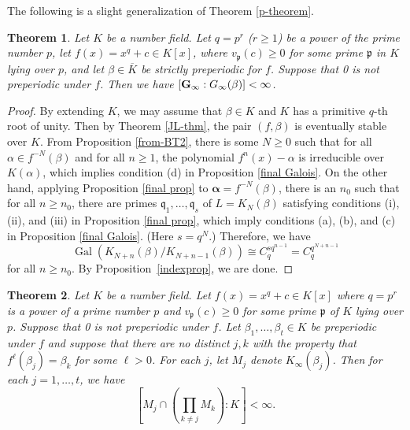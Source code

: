 \documentclass[11pt]{amsart}
\newtheorem{thm}{Theorem}
\theoremstyle{definition}
\theoremstyle{definition}
\numberwithin{thm}{section}
\numberwithin{equation}{thm}
\newcommand{\fp}{\ensuremath{{\mathfrak{p}}}}
\newcommand{\fq}{\ensuremath{{\mathfrak{q}}}}
\newcommand{\Kbar}{\ensuremath {\overline K}}
\newcommand{\ba}{{\boldsymbol \alpha}}
\DeclareMathOperator{\Gal}{Gal}
\begin{document}
The following is a slight generalization of Theorem \ref{p-theorem}.  
\begin{thm}\label{p2}
  Let $K$ be a number field.  Let $q = p^{r}$ ($r\ge 1$) be a power of
  the prime number $p$, let $f(x) = x^q + c \in K[x]$, where $v_\fp(c)\geq 0$ for some prime $\fp$ in $K$ lying over $p$, and let
  $\beta \in \Kbar$ be strictly preperiodic for $f$. Suppose that 0 is not
  preperiodic under $f$.  Then we have
  $[
  {\bf G}_\infty:G_\infty(\beta)] < \infty$.
\end{thm}


\begin{proof}
  By extending $K$, we may assume that $\beta\in K$ and $K$ has a primitive $q$-th
  root of unity. Then by Theorem
  \ref{JL-thm}, the pair $(f,\beta)$ is eventually stable over $K$.
  From Proposition \ref{from-BT2}, there is some $N\ge 0$ such that for all
  $\alpha \in f^{-N}(\beta)$ and for all $n\geq 1$, the polynomial
  $f^n(x)-\alpha$ is irreducible over $K(\alpha)$, which implies
  condition (d) in Proposition \ref{final Galois}.
  On the other hand, applying Proposition
  \ref{final prop} to $\ba=f^{-N}(\beta)$, there is an $n_0$ such that
  for all $n\ge n_0$, there are primes $\fq_1,\dots,\fq_s$ of 
  $L=K_N(\beta)$ satisfying conditions (i), (ii), and (iii) in
  Proposition \ref{final prop}, which imply conditions (a), (b), and (c)
  in Proposition \ref{final Galois}. (Here $s=q^{N}$.)
  Therefore, we have
  \[\Gal(K_{N+n}(\beta)/K_{N+n-1}(\beta))\cong C_q^{sq^{n-1}} = C_q^{q^{N+n-1}}\]
  for all $n\ge n_0$. By Proposition~\ref{indexprop}, we are done.
\end{proof}

\begin{thm}\label{d2}
  Let $K$ be a number field.  Let $f(x) = x^q + c \in K[x]$ where
  $q = p^r$ is a power of a prime number $p$ and $v_\fp(c)\ge 0$ for
  some prime $\fp$ of $K$ lying over $p$.  Suppose that 0 is not
  preperiodic under $f$.  Let
  $\beta_1, \dots, \beta_t \in K$ be preperiodic under $f$ and suppose
  that there are no distinct $j, k$ with the property that
  $f^\ell(\beta_j) = \beta_k$ for some $\ell>0$.  For each $j$, let $M_j$
  denote $K_\infty(\beta_j)$.  Then for each $j=1,\dots, t$, we
  have 
\[ \left[M_j \cap \left(\prod_{k \ne j} M_k\right): K\right] < \infty .\]
\end{thm}
\end{document}
